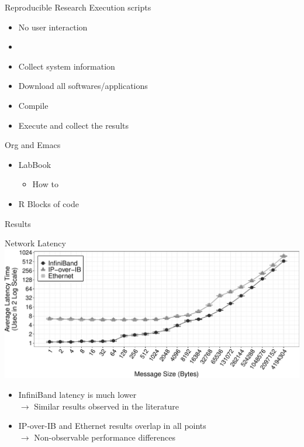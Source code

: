 \documentclass[presentation]{beamer}
\begin{document}
\begin{frame}{Reproducible Research}
\vfill
Execution scripts
\begin{itemize}
    \item No user interaction
    \item 
    \item Collect system information
    \item Download all softwares/applications
    \item Compile
    \item Execute and collect the results
\end{itemize}

Org and Emacs
\begin{itemize}
    \item LabBook
    \begin{itemize}
        \item How to
    \end{itemize}
    \item R Blocks of code
\end{itemize}
\end{frame}


\begin{frame} 
\begin{block}{}
\begin{center}
\Huge{Results}
\end{center}
\end{block}
\end{frame}

\begin{frame}{Network Latency}
\includegraphics[width=\textwidth]{SLIDES/img/Latency.pdf}
\vfill\pause
\begin{itemize}
    \item InfiniBand latency is much lower\\
        $\to$ Similar results observed in the literature
    \item\pause IP-over-IB and Ethernet results overlap in all points\\
        $\to$ Non-observable performance differences
\end{itemize}
\end{frame}
\end{document}

